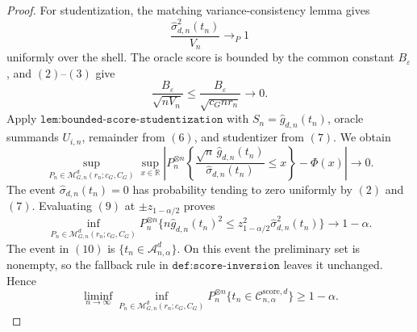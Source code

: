 \documentclass{article}
\begin{document}
\begin{proof}
For studentization, the matching variance-consistency lemma gives
\[\frac{\widehat\sigma_{d,n}^2(t_n)}{V_n}\longrightarrow_P1\tag{7}\]
uniformly over the shell. The oracle score is bounded by the common constant \(B_\varepsilon\), and \((2)\)--\((3)\) give
\[\frac{B_\varepsilon}{\sqrt{nV_n}}\le\frac{B_\varepsilon}{\sqrt{c_Gnr_n}}\longrightarrow0.\tag{8}\]
Apply \(\texttt{lem:bounded-score-studentization}\) with \(S_n=\widehat g_{d,n}(t_n)\), oracle summands \(U_{i,n}\), remainder from \((6)\), and studentizer from \((7)\). We obtain
\[\sup_{P_n\in\mathcal M_{G,n}^d(r_n;c_G,C_G)}\sup_{x\in\mathbb R}\left|P_n^{\otimes n}\!\left\{\frac{\sqrt n\,\widehat g_{d,n}(t_n)}{\widehat\sigma_{d,n}(t_n)}\le x\right\}-\Phi(x)\right|\longrightarrow0.\tag{9}\]
The event \(\widehat\sigma_{d,n}(t_n)=0\) has probability tending to zero uniformly by \((2)\) and \((7)\). Evaluating \((9)\) at \(\pm z_{1-\alpha/2}\) proves
\[\inf_{P_n\in\mathcal M_{G,n}^d(r_n;c_G,C_G)}P_n^{\otimes n}\{n\widehat g_{d,n}(t_n)^2\le z_{1-\alpha/2}^2\widehat\sigma_{d,n}^2(t_n)\}\longrightarrow1-\alpha.\tag{10}\]
The event in \((10)\) is \(\{t_n\in\mathcal A_{n,\alpha}^d\}\). On this event the preliminary set is nonempty, so the fallback rule in \(\texttt{def:score-inversion}\) leaves it unchanged. Hence
\[\liminf_{n\to\infty}\inf_{P_n\in\mathcal M_{G,n}^d(r_n;c_G,C_G)}P_n^{\otimes n}\{t_n\in\mathcal C_{n,\alpha}^{\mathrm{score},d}\}\ge1-\alpha.\tag{11}\]


\end{proof}
\end{document}
